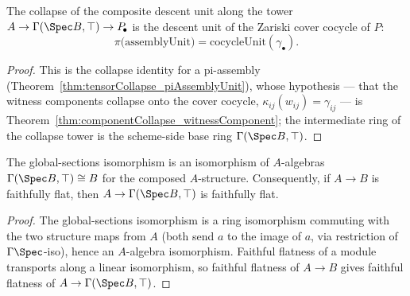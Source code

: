 \begin{theorem}
  \label{thm:tensorCollapse_assemblyUnit}
  \leanok
  The collapse of the composite descent unit along the tower \(A \to \Gamma(\Spec B, \top) \to
  P_{\!\bullet}\) is the descent unit of the Zariski cover cocycle of \(P\):
  \[
    \pi\bigl(\mathrm{assemblyUnit}\bigr) = \mathrm{cocycleUnit}(\gamma_{\bullet}) .
  \]
\end{theorem}
\begin{proof}
  \leanok
  This is the collapse identity for a pi-assembly
  (Theorem~\ref{thm:tensorCollapse_piAssemblyUnit}), whose hypothesis — that the witness
  components collapse onto the cover cocycle, \(\kappa_{ij}(w_{ij}) = \gamma_{ij}\) — is
  Theorem~\ref{thm:componentCollapse_witnessComponent}; the intermediate ring of the collapse
  tower is the scheme-side base ring \(\Gamma(\Spec B, \top)\).
\end{proof}

\begin{lemma}
  \label{lem:faithfullyFlat_sectionsTop}
  \leanok
  The global-sections isomorphism is an isomorphism of \(A\)-algebras \(\Gamma(\Spec B, \top)
  \cong B\) for the composed \(A\)-structure. Consequently, if \(A \to B\) is faithfully flat,
  then \(A \to \Gamma(\Spec B, \top)\) is faithfully flat.
\end{lemma}
\begin{proof}
  \leanok
  The global-sections isomorphism is a ring isomorphism commuting with the two structure maps
  from \(A\) (both send \(a\) to the image of \(a\), via restriction of \(\Gamma\Spec\)-iso),
  hence an \(A\)-algebra isomorphism. Faithful flatness of a module transports along a linear
  isomorphism, so faithful flatness of \(A \to B\) gives faithful flatness of \(A \to
  \Gamma(\Spec B, \top)\).
\end{proof}

